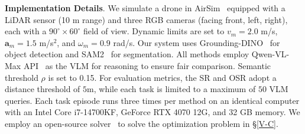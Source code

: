\noindent \textbf{Implementation Details}. 
We simulate a drone in AirSim~\cite{shah2017airsim} equipped with a LiDAR sensor (10 m range) and three RGB cameras (facing front, left, right), each with a $90^\circ \times 60^\circ$ field of view. Dynamic limits are set to $v_{m}=2.0$ m/s, $\mathbf{a}_{m}=1.5$ m/s$^2$, and $\omega_{m}=0.9$ rad/s. Our system uses Grounding-DINO~\cite{liu2024grounding} for object detection and SAM2~\cite{ravi2024sam2} for segmentation. All methods employ Qwen-VL-Max API~\cite{yang2025qwen3} as the VLM for reasoning to ensure fair comparison. Semantic threshold $\rho$ is set to 0.15. For evaluation metrics, the SR and OSR adopt a distance threshold of $5\text{m}$, while each task is limited to a maximum of $50$ VLM queries. Each task episode runs three times per method on an identical computer with an Intel Core i7-14700KF, GeForce RTX 4070 12G, and 32 GB memory. We employ an open-source solver~\cite{solver} to solve the optimization problem in \S\ref{V-C}.



\begin{table}[t]
\caption{\textbf{Overall Performance Comparison}. Best results in \colorbox{cyan!15}{cyan}, second-best in \colorbox{violet!15}{violet}, and Human Agent in \colorbox{gray!20}{gray}.}
\vspace{-5pt}
\centering
\renewcommand{\arraystretch}{1.3}
\label{tab:overall}
\vspace{-18pt}
\end{table}


